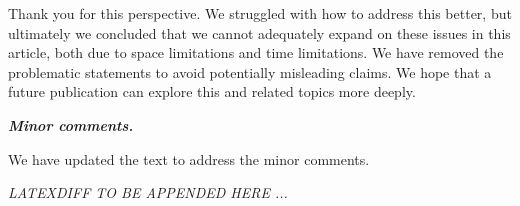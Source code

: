 \documentclass[11pt]{mhletter}
\begin{document}
Thank you for this perspective.  We struggled with how to address this better, but ultimately we concluded that we cannot adequately expand on these issues in this article, both due to space limitations and time limitations.  We have removed the problematic statements to avoid potentially misleading claims.  We hope that a future publication can explore this and related topics more deeply.


\textbf{\textit{Minor comments.}}

We have updated the text to address the minor comments.

\clearpage
\emph{LATEXDIFF TO BE APPENDED HERE ...}
\end{document}
